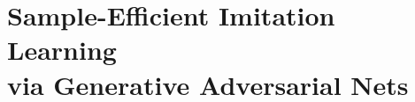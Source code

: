

\chapter[%
Sample-efficient imitation learning via GANs]{%
Sample-Efficient Imitation Learning \\
via Generative Adversarial Nets}
\label{thesis:chap1}



\clearpage
\begin{subappendices}

\end{subappendices}
